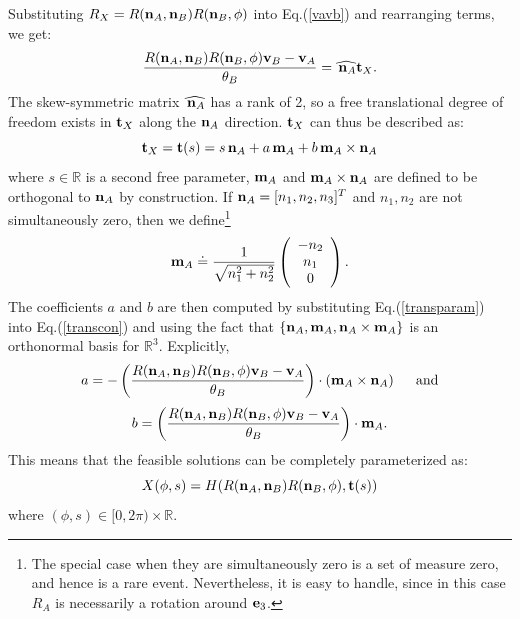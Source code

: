 \documentclass[twocolumn,10pt]{asme2ej}
\newcommand{\IR}{\mathbb{R}}
\begin{document}
Substituting $R_X = R({\bf n}_A, {\bf n}_B) R({\bf n}_B, \phi)$ into Eq.(\ref{vavb}) and rearranging terms, we get:
\begin{equation}
\frac{R({\bf n}_A, {\bf n}_B) R({\bf n}_B, \phi) {\bf v}_B - {\bf v}_A}{\theta_B} = \widehat{\, {\bf n}_A} {\bf t}_X.
\label{transcon} \end{equation}
The skew-symmetric matrix $\widehat{\, {\bf n}_A}$ has a rank of 2, so a free translational degree of freedom exists in ${\bf t}_X$ along the ${\bf n}_A$ direction. ${\bf t}_X$ can thus be described as:
\begin{equation}
{\bf t}_X =  {\bf t}(s) = s \, {\bf n}_A + a \, {\bf m}_A + b \, {\bf m}_A \times {\bf n}_A
\label{transparam} \end{equation}
where $s \in \mathbb{R}$ is a second free parameter, ${\bf m}_A$ and ${\bf m}_A \times {\bf n}_A$ are
defined to be orthogonal to ${\bf n}_A$ by construction. If
${\bf n}_A  = [n_1, n_2, n_3]^T$ and $n_1, n_2$ are not simultaneously zero, then we define\footnote{The special case when they are simultaneously zero
is a set of measure zero, and hence is a rare event. Nevertheless, it is easy to handle, since in this case $R_A$ is necessarily a rotation around ${\bf e}_3$.}
$$ {\bf m}_A \doteq \frac{1}{\sqrt{n_1^2 + n_2^2}} \left(\begin{array}{c}
-n_2 \\
n_1 \\
0 \end{array}\right).
$$
The coefficients $a$ and $b$ are then computed by substituting Eq.(\ref{transparam}) into Eq.(\ref{transcon}) and using the fact that
$\{{\bf n}_A, {\bf m}_A, {\bf n}_A \times {\bf m}_A\}$ is an orthonormal basis for $\mathbb{R}^3$. Explicitly,
$$ a = - \left(\frac{R({\bf n}_A, {\bf n}_B) R({\bf n}_B, \phi) {\bf v}_B - {\bf v}_A}{\theta_B}\right) \cdot \left({\bf m}_A \times {\bf n}_A\right) \hspace{5mm}\mbox{and}$$
$$ b =\left(\frac{R({\bf n}_A, {\bf n}_B) R({\bf n}_B, \phi) {\bf v}_B - {\bf v}_A}{\theta_B}\right)\cdot {\bf m}_A . $$
This means that the feasible solutions can be completely parameterized as:
\begin{equation}
X(\phi,s) = H(R({\bf n}_A, {\bf n}_B) R({\bf n}_B, \phi), {\bf t}(s))
\label{cylinder} \end{equation}
where $(\phi, s) \in [0,2\pi) \times \IR$.
\end{document}
